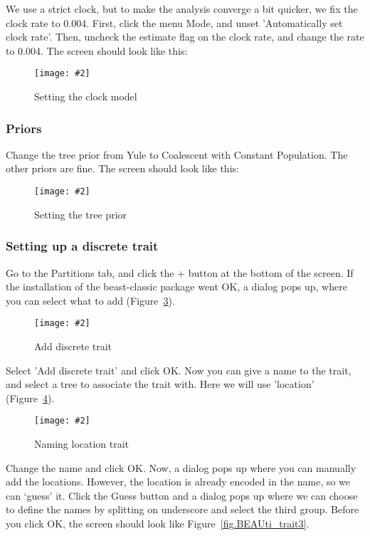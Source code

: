 \documentclass{article}
\newcommand{\includeimage}[2][]{%
\texttt{[image: \#2]}
}
\begin{document}
We use a strict clock, but to make the analysis converge a bit quicker, we fix the clock rate to 0.004.
First, click the menu Mode, and unset 'Automatically set clock rate'. Then, uncheck the estimate flag on the clock rate, and change the rate to 0.004.
The screen should look like this:

\begin{figure}
\centering	
\includeimage[scale=0.3]{figures/BEAUti_clockmodel}
\caption{Setting the clock model}
\label{fig.BEAUti_clockmodel}
\end{figure}

\subsubsection*{Priors}

Change the tree prior from Yule to Coalescent with Constant Population. The other priors are fine. The screen should look like this:

\begin{figure}
\centering	
\includeimage[scale=0.3,clip=true,trim=0 400 0 0]{figures/BEAUti_priors}
\caption{Setting the tree prior}
\label{fig.BEAUti_priors}
\end{figure}

\subsubsection*{Setting up a discrete trait}

Go to the Partitions tab, and click the + button at the bottom of the screen.
If the installation of the beast-classic package went OK, a dialog pops up, where you can select what to add (Figure~\ref{fig.BEAUti_trait}).

\begin{figure}
\centering	
\includeimage[scale=0.3]{figures/BEAUti_trait}
\caption{Add discrete trait}
\label{fig.BEAUti_trait}
\end{figure}

Select 'Add discrete trait' and click OK. Now you can give a name to the trait, and select a tree to associate the trait with. Here we will use 'location' (Figure~\ref{fig.BEAUti_trait2}).

\begin{figure}
\centering	
\includeimage[scale=0.3]{figures/BEAUti_trait2}
\caption{Naming location trait}
\label{fig.BEAUti_trait2}
\end{figure}

Change the name and click OK. Now, a dialog pops up where you can manually add the locations. However, the location is already encoded in the name, so we can `guess' it. Click the Guess button and a dialog pops up where we can choose to define the names by splitting on underscore and select the third group. Before you click OK, the screen should look like Figure~\ref{fig.BEAUti_trait3}.
\end{document}
